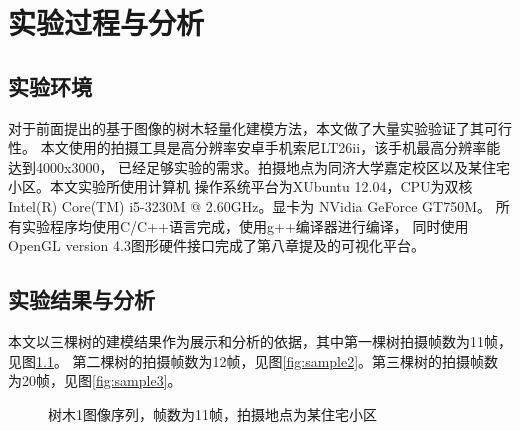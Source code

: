 
\chapter{实验过程与分析}

\section{实验环境}
对于前面提出的基于图像的树木轻量化建模方法，本文做了大量实验验证了其可行性。
本文使用的拍摄工具是高分辨率安卓手机索尼LT26ii，该手机最高分辨率能达到4000x3000，
已经足够实验的需求。拍摄地点为同济大学嘉定校区以及某住宅小区。本文实验所使用计算机
操作系统平台为XUbuntu 12.04，CPU为双核Intel(R) Core(TM) i5-3230M @ 2.60GHz。显卡为
NVidia GeForce GT750M。 所有实验程序均使用C/C++语言完成，使用g++编译器进行编译，
同时使用OpenGL version 4.3图形硬件接口完成了第八章提及的可视化平台。

\section{实验结果与分析}
本文以三棵树的建模结果作为展示和分析的依据，其中第一棵树拍摄帧数为11帧，见图\ref{fig:sample1}。
第二棵树的拍摄帧数为12帧，见图\ref{fig:sample2}。第三棵树的拍摄帧数为20帧，见图\ref{fig:sample3}。

\begin{figure}[H]
	\captionsetup[subfigure]{labelformat=empty}
	\hspace{1mm}
	\hspace{1mm}
	\hspace{1mm}
	\hspace{1mm}
	\hspace{1mm}
	\hspace{1mm}
	\hspace{1mm}
	\hspace{1mm}
	\hspace{1mm}
	\hspace{1mm}
	\caption{树木1图像序列，帧数为11帧，拍摄地点为某住宅小区}
	\label{fig:sample1}
\end{figure}

